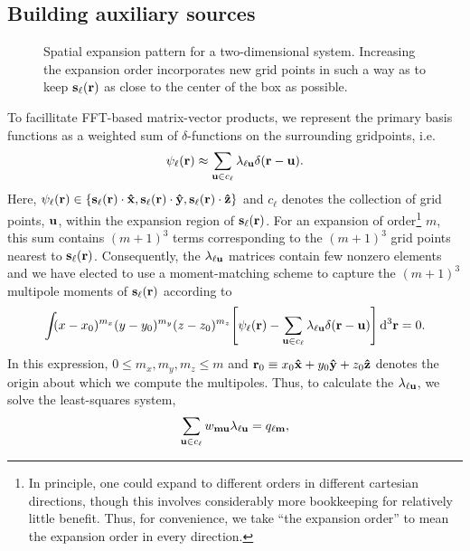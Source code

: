 \subsection{Building auxiliary sources}

\begin{figure}
  \centering
  \caption{\label{fig:expansion grid}Spatial expansion pattern for a two-dimensional system.
    Increasing the expansion order incorporates new grid points in such a way as to keep $\vb{s}_\ell(\vb{r})$ as close to the center of the box as possible.
  }
\end{figure}

To facillitate FFT-based matrix-vector products, we represent the primary basis functions as a weighted sum of $\delta$-functions on the surrounding gridpoints, i.e.
\begin{equation}
  \psi_\ell(\vb{r}) \approx \sum_{\vb{u} \in c_{\ell}} \lambda_{\ell\vb{u}} \delta(\vb{r} - \vb{u}).
  \label{eq:grid linear combination}
\end{equation}
Here, $\psi_\ell(\vb{r}) \in \qty{\vb{s}_\ell(\vb{r})\cdot \vu{x}, \vb{s}_\ell(\vb{r}) \cdot \vu{y}, \vb{s}_\ell(\vb{r}) \cdot \vu{z}}$ and $c_\ell$ denotes the collection of grid points, $\vb{u}$, within the expansion region of $\vb{s}_\ell(\vb{r})$.
For an expansion of order\footnote{In principle, one could expand to different orders in different cartesian directions, though this involves considerably more bookkeeping for relatively little benefit. Thus, for convenience, we take ``the expansion order'' to mean the expansion order in every direction.} $m$, this sum contains $(m + 1)^3$ terms corresponding to the $(m + 1)^3$ grid points nearest to $\vb{s}_\ell(\vb{r})$.
Consequently, the $\lambda_{\ell \vb{u}}$ matrices contain few nonzero elements and we have elected to use a moment-matching scheme to capture the $(m + 1)^3$ multipole moments of $\vb{s}_\ell(\vb{r})$ according to
\begin{equation}
  \int_{} \kern0.1em (x - x_0)^{m_x}(y - y_0)^{m_y}(z - z_0)^{m_z} \qty[\psi_\ell(\vb{r}) - \sum_{\vb{u} \in c_\ell}\lambda_{\ell\vb{u}}\delta(\vb{r} - \vb{u})] \dd[3]{\vb{r}} = 0.
  \label{eq:moment matching}
\end{equation}
In this expression, $0 \leqslant m_x, m_y, m_z \leqslant m$ and $\vb{r}_0 \equiv x_0 \vu{x} + y_0 \vu{y} + z_0\vu{z}$ denotes the origin about which we compute the multipoles.
Thus, to calculate the $\lambda_{\ell \vb{u}}$, we solve the least-squares system,
\begin{equation}
  \sum_{\vb{u} \in c_\ell} w_{\vb{m}\vb{u}}\lambda_{\ell\vb{u}} = q_{\ell\vb{m}},
  \label{eq:expansion matrix system}
\end{equation}
